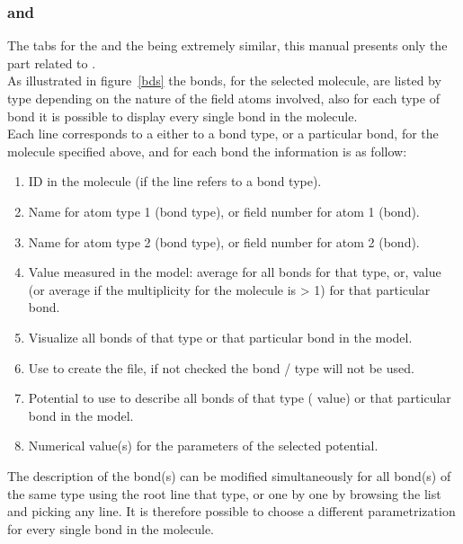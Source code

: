 \newpage
\subsubsection*{ and }

The tabs for the  and the  being extremely similar, 
this manual presents only the part related to . \\
As illustrated in figure~\ref{bds} the bonds, for the selected molecule, are listed by type depending on the nature of the field atoms involved, 
also for each type of bond it is possible to display every single bond in the molecule. \\
\laf Each line corresponds to a either to a bond type, or a particular bond, for the molecule specified above, and for each bond the information is as follow:
\begin{enumerate}
\item ID in the molecule (if the line refers to a bond type).
\item Name for atom type 1 (bond type), or field number for atom 1 (bond).
\item Name for atom type 2 (bond type), or field number for atom 2 (bond).
\item Value measured in the model: average for all bonds for that type, or, value (or average if the multiplicity for the molecule is > 1) for that particular bond.
\item Visualize all bonds of that type or that particular bond in the model.
\item Use to create the  file, if not checked the bond / type will not be used.
\item Potential to use to describe all bonds of that type ( value) or that particular bond in the model.
\item Numerical value(s) for the parameters of the selected potential.
\end{enumerate}
The description of the bond(s) can be modified simultaneously for all bond(s) of the same type using the root line that type, 
or one by one by browsing the list and picking any line. 
It is therefore possible to choose a different parametrization for every single bond in the molecule. 
